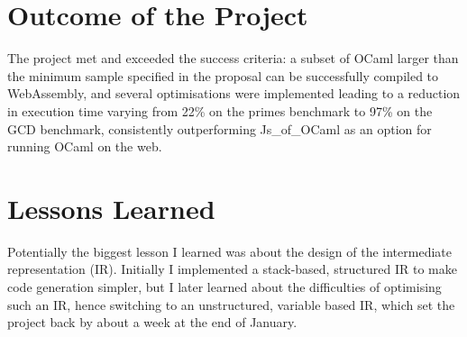 \documentclass[12pt,twoside,notitlepage]{report}
\newcommand{\cfbox}[2]{%
	\colorlet{currentcolor}{.}%
	{\color{#1}%
		\fbox{\color{currentcolor}#2}}%
}
\newcommand\note[1]{\noindent\cfbox{blue}{\parbox{\textwidth}{\textcolor{blue}{#1}}}}
\begin{document}
\note{
	\begin{itemize}
		\item SSA based IR?
		\item More optimisations e.g. reverse copy-propagation, mutually recursive tail call optimisation, better match statements, better code generator that can re-order non side effecting instructions, speedy append implementation
		\item More feature support: strings, records and mutable records, modules, named/optional function arguments, using the operators as function arguments (e.g. List.reduce ~f:(+) nums to sum a list)
	\end{itemize}
}



\section{Outcome of the Project}
The project met and exceeded the success criteria: a subset of OCaml larger than the minimum sample specified in the proposal can be successfully compiled to WebAssembly, and several optimisations were implemented leading to a reduction in execution time varying from 22\% on the primes benchmark to 97\% on the GCD benchmark, consistently outperforming Js\_of\_OCaml as an option for running OCaml on the web.

\section{Lessons Learned}
Potentially the biggest lesson I learned was about the design of the intermediate representation (IR). Initially I implemented a stack-based, structured IR to make code generation simpler, but I later learned about the difficulties of optimising such an IR, hence switching to an unstructured, variable based IR, which set the project back by about a week at the end of January.
\end{document}
